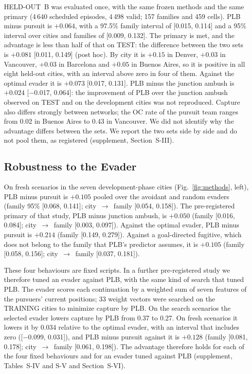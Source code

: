 \documentclass[5p,twocolumn]{elsarticle}
\begin{document}
HELD-OUT~B was evaluated once, with the same frozen methods and the same primary (4\,640 scheduled episodes, 4\,498
valid; 157 families and 459 cells). PLB minus pursuit is $+0.064$, with a 97.5\% family interval of [0.015, 0.114]
and a 95\% interval over cities and families of [0.009, 0.132]. The primary is met, and the advantage is less than
half of that on TEST: the difference between the two sets is $+0.081$ [0.011, 0.149] (post hoc). By city it is
$+0.15$ in Denver, $+0.03$ in Vancouver, $+0.03$ in Barcelona and $+0.05$ in Buenos Aires, so it is positive in all
eight held-out cities, with an interval above zero in four of them. Against the optimal evader it is $+0.073$
[0.017, 0.131]. PLB minus the junction ambush is $+0.024$ [$-$0.017, 0.064]: the improvement of PLB over the junction
ambush observed on TEST and on the development cities was not reproduced. Capture also differs strongly between
networks; the OC rate of the pursuit team ranges from 0.02 in Buenos Aires to 0.43 in Vancouver. We did not identify
why the advantage differs between the sets. We report the two sets side by side and do not pool them, as registered
(supplement, Section~S-III).

\subsection{Robustness to the Evader}
\label{sec:evaders}

On fresh scenarios in the seven development-phase cities (Fig.~\ref{fig:methods}, left), PLB minus pursuit is
$+0.105$ pooled over the avoidant and random evaders (family 95\% [0.068, 0.141]; city~$\to$~family [0.054, 0.158]).
The pre-registered primary of that study, PLB minus junction ambush, is $+0.050$ (family [0.016, 0.084];
city~$\to$~family [0.003, 0.097]). Against the optimal evader, PLB minus pursuit is $+0.214$ (family [0.149, 0.279]).
Against a goal-directed fugitive, which does not belong to the family that PLB's predictor assumes, it is $+0.105$
(family [0.058, 0.156]; city~$\to$~family [0.037, 0.181]).

These four behaviours are fixed scripts. In a further pre-registered study we therefore tuned an evader against PLB,
with the same kind of search that tuned PLB. The evader scores each continuation by a weighted sum of seven features
of the pursuers' current positions; 33 weight vectors were searched on the TRAINING cities to minimize capture by
PLB. On the search scenarios the selected evader lowers capture by PLB from 0.37 to 0.27. On fresh scenarios it lowers
it by 0.034 relative to the optimal evader, with an interval that includes zero ([$-$0.099, 0.031]), and PLB minus
pursuit against it is $+0.128$ (family [0.081, 0.178]; city~$\to$~family [0.061, 0.198]). The advantage therefore
holds for each of the four fixed behaviours and for an evader tuned against PLB (supplement, Tables~S-IV and S-V and
Section~S-VI).
\end{document}
